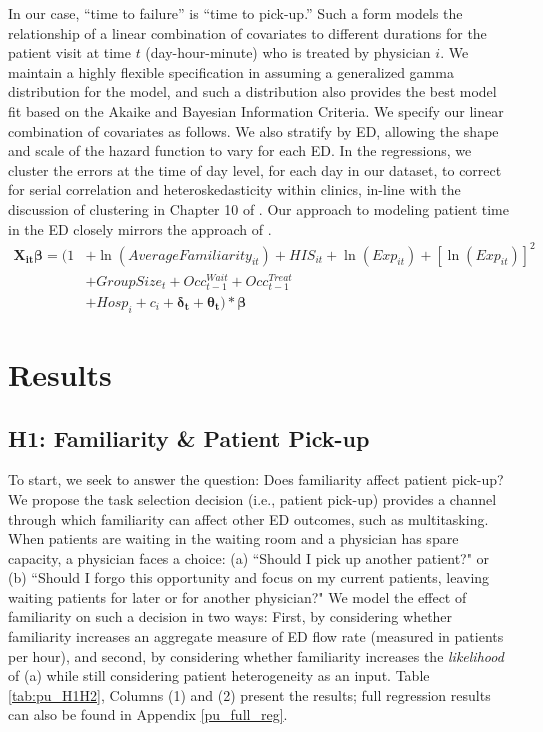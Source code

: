  In our case, “time to failure” is “time to pick-up.” Such a form models the relationship of a linear combination of covariates to different durations for the patient visit at time $t$ (day-hour-minute) who is treated by physician $i$. We maintain a highly flexible specification in assuming a generalized gamma distribution for the model, and such a distribution also provides the best model fit based on the Akaike and Bayesian Information Criteria. We specify our linear combination of covariates as follows. We also stratify by ED, allowing the shape and scale of the hazard function to vary for each ED. In the regressions, we cluster the errors at the time of day level, for each day in our dataset, to correct for serial correlation and heteroskedasticity within clinics, in-line with the discussion of clustering in Chapter 10 of \cite{Cleves2016}. Our approach to modeling patient time in the ED closely mirrors the approach of \cite{Batt2017}.
  \begin{equation} \begin{split} %
        \boldsymbol{X_{it}}\boldsymbol{\beta} = (1 & + \ln(AverageFamiliarity_{it}) + HIS_{it} + \ln(Exp_{it}) + [\ln(Exp_{it})]^2 \\
        & + GroupSize_t + Occ_{t-1}^{Wait} + Occ_{t-1}^{Treat}   \\
        & + Hosp_i + c_i + \boldsymbol{\delta_t} + \boldsymbol{\theta_t} ) * \boldsymbol{\beta}
  \end{split}  \end{equation}
  
  
\section{Results} \label{Results_PU}
 \subsection{H1: Familiarity \& Patient Pick-up} \label{results_H1}
 To start, we seek to answer the question: Does familiarity affect patient pick-up? We propose the task selection decision (i.e., patient pick-up) provides a channel through which familiarity can affect other ED outcomes, such as multitasking. When patients are waiting in the waiting room and a physician has spare capacity, a physician faces a choice: (a) “Should I pick up another patient?" or (b) “Should I forgo this opportunity and focus on my current patients, leaving waiting patients for later or for another physician?" We model the effect of familiarity on such a decision in two ways: First, by considering whether familiarity increases an aggregate measure of ED flow rate (measured in patients per hour), and second, by considering whether familiarity increases the \textit{likelihood} of (a) while still considering patient heterogeneity as an input. Table \ref{tab:pu_H1H2}, Columns (1) and (2) present the results; full regression results can also be found in Appendix \ref{pu_full_reg}. 
 
